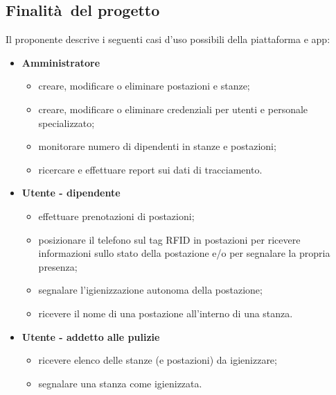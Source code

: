 \subsection{Finalità del progetto}
Il proponente descrive i seguenti casi d'uso possibili della piattaforma e app:
\begin{itemize}
    \item \textbf{Amministratore}
    \begin{itemize}
        \item creare, modificare o eliminare postazioni e stanze;
        \item creare, modificare o eliminare credenziali per utenti e personale specializzato;
        \item monitorare numero di dipendenti in stanze e postazioni;
        \item ricercare e effettuare report sui dati di tracciamento.
    \end{itemize}
    \item \textbf{Utente - dipendente}
    \begin{itemize}
        \item effettuare prenotazioni di postazioni;
        \item posizionare il telefono sul tag RFID in postazioni per ricevere informazioni sullo stato della postazione e/o per segnalare la propria presenza;
        \item segnalare l'igienizzazione autonoma della postazione;
        \item ricevere il nome di una postazione all'interno di una stanza.
    \end{itemize}
    \item \textbf{Utente - addetto alle pulizie}
    \begin{itemize}
        \item ricevere elenco delle stanze (e postazioni) da igienizzare;
        \item segnalare una stanza come igienizzata.
    \end{itemize}
\end{itemize}
